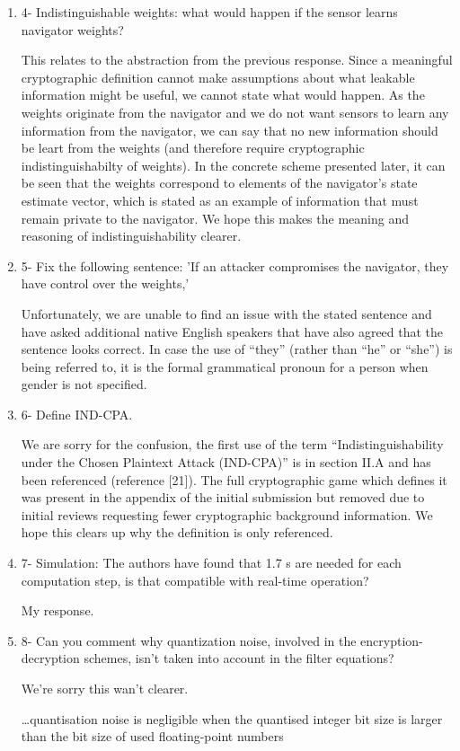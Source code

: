 \documentclass[a4paper]{scrartcl}
\newenvironment{rebuttal}{\begin{enumerate}[label={\color{grey}\thesection.\arabic{enumi}},leftmargin=0pt,ref=\thesection.\arabic{enumi}]}{\end{enumerate}}
\newcommand{\reviewtext}[1]{{\color{nblue} #1}}
\begin{document}
\begin{rebuttal}
\item \reviewtext{4- Indistinguishable weights: what would happen if the sensor learns navigator weights?}

This relates to the abstraction from the previous response. Since a meaningful cryptographic definition cannot make assumptions about what leakable information might be useful, we cannot state what would happen. As the weights originate from the navigator and we do not want sensors to learn any information from the navigator, we can say that no new information should be leart from the weights (and therefore require cryptographic indistinguishabilty of weights). In the concrete scheme presented later, it can be seen that the weights correspond to elements of the navigator's state estimate vector, which is stated as an example of information that must remain private to the navigator. We hope this makes the meaning and reasoning of indistinguishability clearer.

\item \reviewtext{5- Fix the following sentence: 'If an attacker compromises the navigator, they have control over the weights,'}

Unfortunately, we are unable to find an issue with the stated sentence and have asked additional native English speakers that have also agreed that the sentence looks correct. In case the use of ``they'' (rather than ``he'' or ``she'') is being referred to, it is the formal grammatical pronoun for a person when gender is not specified.

\item \reviewtext{6- Define IND-CPA.}

We are sorry for the confusion, the first use of the term ``Indistinguishability under the Chosen Plaintext Attack (IND-CPA)'' is in section II.A and has been referenced (reference [21]). The full cryptographic game which defines it was present in the appendix of the initial submission but removed due to initial reviews requesting fewer cryptographic background information. We hope this clears up why the definition is only referenced.

\item \reviewtext{7- Simulation: The authors have found that 1.7 s are needed for each
computation step, is that compatible with real-time operation?}

My response.

\item \reviewtext{8- Can you comment why quantization noise, involved in the encryption-decryption schemes, isn't taken into account in the filter equations?}

We're sorry this wan't clearer. 


\dots quantisation noise is negligible when the quantised integer bit size is larger than the bit size of used floating-point numbers


\end{rebuttal}
\end{document}
